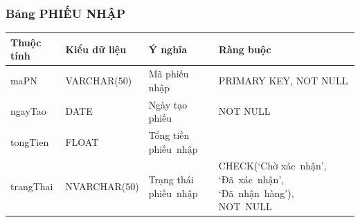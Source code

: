 \documentclass[a4paper,12pt]{report}
\begin{document}
\subsubsection{Bảng PHIẾU NHẬP}
\noindent
\begin{center}
    \begin{tabular}{|>{\centering\arraybackslash}p{3cm}|
        >{\centering\arraybackslash}p{4cm}|
        >{\centering\arraybackslash}p{4cm}|
        >{\centering\arraybackslash}p{4cm}|}
        \hline
        \textbf{Thuộc tính}                                                                                                               &
        \textbf{Kiểu dữ liệu}                                                                                                                             &
        \textbf{Ý nghĩa}                                                                                                 &
        \textbf{Ràng buộc}                                                                                                         \\
        \hline
        maPN &  VARCHAR(50)  & Mã phiếu nhập & PRIMARY KEY, NOT NULL \\
        \hline
        ngayTao &  DATE  & Ngày tạo phiếu & NOT NULL \\                                                                                                                          
        \hline
        tongTien & FLOAT & Tổng tiền phiếu~nhập & \\                                                                                                                          
        \hline
        trangThai &  NVARCHAR(50)  & Trạng thái phiếu~nhập & CHECK(‘Chờ xác~nhận’, ‘Đã~xác~nhận’, ‘Đã~nhận~hàng’), NOT~NULL \\
        \hline
    \end{tabular}
\end{center}
\end{document}

